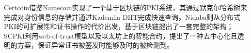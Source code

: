 

Certcoin\cite{fromknecht2014decentralized}借鉴Namecoin实现了一个基于区块链的PKI系统，其通过默克尔哈希树来完成对身份信息的存储并通过Kademlia DHT完成快速查询。Nidaba\cite{rystsovnidaba}则从分布式PKI的可扩展性和证书操作的代价出发，基于区块链提出了一套完整的架构；SCPKI\cite{al2017scpki}利用web-of-trust模型以及以太坊上的智能合约，提出了一种去中心化且透明的方案，保证异常证书被签发时能够及时的被检测到。


























